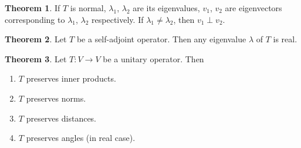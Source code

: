 \documentclass[fleqn, a4paper, 12pt]{article}
\theoremstyle{definition}
\theoremstyle{theorem}
\newtheorem{theorem}{Theorem} %
\theoremstyle{remark}
\numberwithin{corollary}{theorem}
\numberwithin{equation}{theorem}
\begin{document}
\begin{theorem}
	If $T$ is normal, $\lambda_1$, $\lambda_2$ are its eigenvalues, $v_1$, $v_2$ are eigenvectors corresponding to $\lambda_1$, $\lambda_2$ respectively. If $\lambda_1 \neq \lambda_2$, then $v_1 \perp v_2$.
\end{theorem}

\begin{theorem}
	Let $T$ be a self-adjoint operator. Then any eigenvalue $\lambda$ of $T$ is real.
\end{theorem}

\begin{theorem}
	Let $T : V \to V$ be a unitary operator. Then
	\begin{enumerate}
		\item $T$ preserves inner products.
		\item $T$ preserves norms.
		\item $T$ preserves distances.
		\item $T$ preserves angles (in real case).
	\end{enumerate}
\end{theorem}
\end{document}
